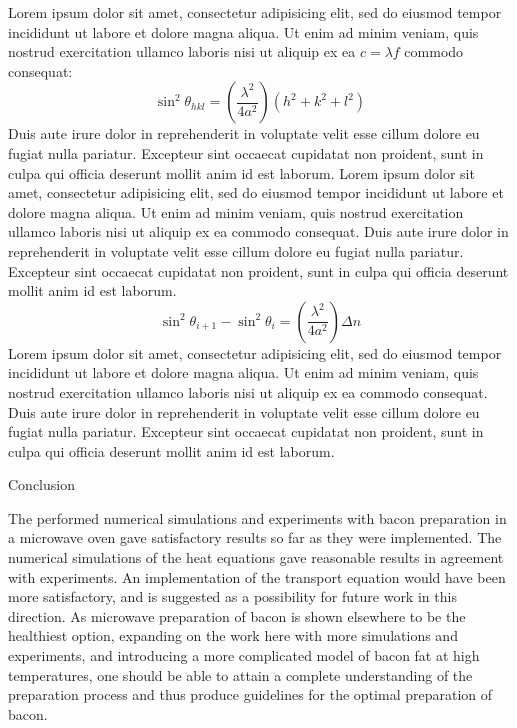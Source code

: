 \documentclass[final,hyperref={pdfpagelabels=false}]{beamer}
\begin{document}
\begin{frame}{}
\begin{columns}[t]
\begin{column}{.97\textwidth}
\begin{multicols}{2}
    \vspace{1.0\baselineskip}	
	Lorem ipsum dolor sit amet, consectetur adipisicing
	elit, sed do eiusmod tempor incididunt ut labore et
	dolore magna aliqua. Ut enim ad minim veniam, quis
	nostrud exercitation ullamco laboris nisi ut aliquip
	ex ea $c = \lambda f$ commodo consequat:
	\[ \sin^{2}\theta_{hkl}=(\frac{\lambda^{2}}{4a^{2}})(h^{2}+k^{2}+l^{2}) \]
	Duis aute irure dolor in
	reprehenderit in voluptate velit esse cillum dolore
	eu fugiat nulla pariatur. Excepteur sint occaecat
	cupidatat non proident, sunt in culpa qui officia
	deserunt mollit anim id est laborum.
	Lorem ipsum dolor sit amet, consectetur adipisicing
	elit, sed do eiusmod tempor incididunt ut labore et
	dolore magna aliqua. Ut enim ad minim veniam, quis
	nostrud exercitation ullamco laboris nisi ut aliquip
	ex ea commodo consequat. Duis aute irure dolor in
	reprehenderit in voluptate velit esse cillum dolore
	eu fugiat nulla pariatur. Excepteur sint occaecat
	cupidatat non proident, sunt in culpa qui officia
	deserunt mollit anim id est laborum.
	\[ \sin^{2}\theta_{i+1}-\sin^{2}\theta_{i}=(\frac{\lambda^{2}}{4a^{2}})\Delta n \]
	Lorem ipsum dolor sit amet, consectetur adipisicing
	elit, sed do eiusmod tempor incididunt ut labore et
	dolore magna aliqua. Ut enim ad minim veniam, quis
	nostrud exercitation ullamco laboris nisi ut aliquip
	ex ea commodo consequat. Duis aute irure dolor in
	reprehenderit in voluptate velit esse cillum dolore
	eu fugiat nulla pariatur. Excepteur sint occaecat
	cupidatat non proident, sunt in culpa qui officia
	deserunt mollit anim id est laborum.

\vspace{1.0\baselineskip}
{\Large Conclusion}

    The performed numerical simulations and experiments with bacon preparation
in a microwave oven gave satisfactory results so far as they were implemented.
The numerical simulations of the heat equations gave reasonable results in agreement
with experiments. An implementation of the transport equation would have been
more satisfactory, and is suggested as a possibility for future work in this
direction. As microwave preparation of bacon is shown elsewhere to be the
healthiest option, expanding on the work here with more simulations and
experiments, and introducing a more complicated model of bacon fat at high
temperatures, one should be able to attain a complete understanding of the
preparation process and thus produce guidelines for the optimal preparation of
bacon.



\end{multicols}
\end{column}
\end{columns}
\end{frame}
\end{document}
